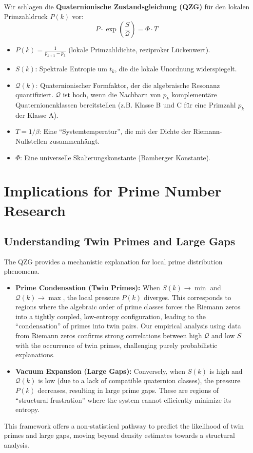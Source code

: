 \documentclass[11pt,twocolumn,a4paper]{article}
\newcommand{\entropy}{S}
\newcommand{\formfactor}{\mathcal{Q}}
\newcommand{\pressure}{P}
\newcommand{\temperature}{T}
\newcommand{\bamberger}{\Phi}
\theoremstyle{definition}
\begin{document}
Wir schlagen die \textbf{Quaternionische Zustandsgleichung (QZG)} für den lokalen Primzahldruck $\pressure(k)$ vor:
\begin{equation}
\label{eq:qzg_de}
\pressure \cdot \exp\left(\frac{\entropy}{\formfactor}\right) = \bamberger \cdot \temperature
\end{equation}
\begin{itemize}
    \item $\pressure(k) = \frac{1}{p_{k+1} - p_k}$ (lokale Primzahldichte, reziproker Lückenwert).
    \item $\entropy(k)$: Spektrale Entropie um $t_k$, die die lokale Unordnung widerspiegelt.
    \item $\formfactor(k)$: Quaternionischer Formfaktor, der die algebraische Resonanz quantifiziert. $\formfactor$ ist hoch, wenn die Nachbarn von $p_k$ komplementäre Quaternionenklassen bereitstellen (z.B. Klasse B und C für eine Primzahl $p_k$ der Klasse A).
    \item $\temperature = 1/\beta$: Eine ``Systemtemperatur'', die mit der Dichte der Riemann-Nullstellen zusammenhängt.
    \item $\bamberger$: Eine universelle Skalierungskonstante (Bamberger Konstante).
\end{itemize}

\section{Implications for Prime Number Research}
\label{sec:implications}

\subsection{Understanding Twin Primes and Large Gaps}
The QZG provides a mechanistic explanation for local prime distribution phenomena.
\begin{itemize}
    \item \textbf{Prime Condensation (Twin Primes):} When $\entropy(k) \to \min$ and $\formfactor(k) \to \max$, the local pressure $\pressure(k)$ diverges. This corresponds to regions where the algebraic order of prime classes forces the Riemann zeros into a tightly coupled, low-entropy configuration, leading to the ``condensation'' of primes into twin pairs. Our empirical analysis using data from Riemann zeros confirms strong correlations between high $\formfactor$ and low $\entropy$ with the occurrence of twin primes, challenging purely probabilistic explanations.
    \item \textbf{Vacuum Expansion (Large Gaps):} Conversely, when $\entropy(k)$ is high and $\formfactor(k)$ is low (due to a lack of compatible quaternion classes), the pressure $\pressure(k)$ decreases, resulting in large prime gaps. These are regions of ``structural frustration'' where the system cannot efficiently minimize its entropy.
\end{itemize}
This framework offers a non-statistical pathway to predict the likelihood of twin primes and large gaps, moving beyond density estimates towards a structural analysis.
\end{document}
